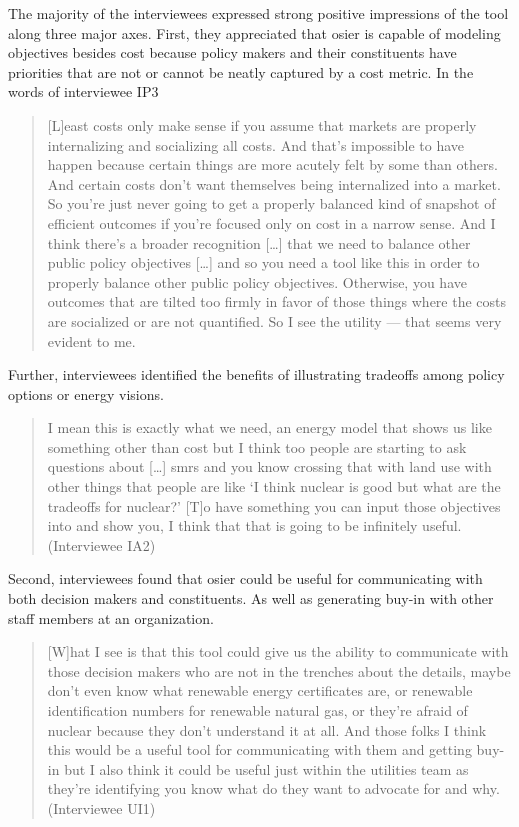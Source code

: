 The majority of the interviewees expressed strong positive impressions of the
tool along three major axes. First, they appreciated that \ac{osier} is capable
of modeling objectives besides cost because policy makers and their constituents
have priorities that are not or cannot be neatly captured by a cost metric. In
the words of interviewee IP3
\begin{quote}
    [L]east costs only make sense if you assume that markets are properly
    internalizing and socializing all costs. And that's impossible to have
    happen because certain things are more acutely felt by some than others. And
    certain costs don't want themselves being internalized into a market. So
    you're just never going to get a properly balanced kind of snapshot of
    efficient outcomes if you're focused only on cost in a narrow sense. And I
    think there's a broader recognition [\dots] that we need to balance other
    public policy objectives [\dots] and so you need a tool like this in order
    to properly balance other public policy objectives. Otherwise, you have
    outcomes that are tilted too firmly in favor of those things where the costs
    are socialized or are not quantified. So I see the utility --- that seems
    very evident to me.
\end{quote}
Further, interviewees identified the benefits of illustrating tradeoffs among
policy options or energy visions.
\begin{quote}
    I mean this is exactly what we need, an energy model that shows us like
    something other than cost but I think too people are starting to ask
    questions about [\dots] \acp{smr} and you know crossing that with land use
    with other things that people are like `I think nuclear is good but what are
    the tradeoffs for nuclear?' [T]o have something you can input those
    objectives into and show you, I think that that is going to be infinitely
    useful. (Interviewee IA2)
\end{quote}

Second, interviewees found that \ac{osier} could be useful for communicating
with both decision makers and constituents. As well as generating buy-in with
other staff members at an organization.
\begin{quote}
    [W]hat I see is that this tool could give us the ability to communicate with
    those decision makers who are not in the trenches about the details, maybe
    don't even know what renewable energy certificates are, or renewable
    identification numbers for renewable natural gas, or they're afraid of
    nuclear because they don't understand it at all. And those folks I think
    this would be a useful tool for communicating with them and getting buy-in
    but I also think it could be useful just within the utilities team as
    they're identifying you know what do they want to advocate for and why.
    (Interviewee UI1)
\end{quote}

